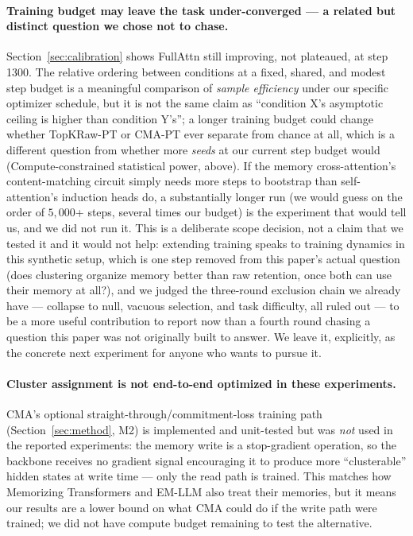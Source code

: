 \documentclass[11pt]{article}
\begin{document}
\paragraph{Training budget may leave the task under-converged --- a related but distinct question
we chose not to chase.} Section~\ref{sec:calibration} shows FullAttn still improving, not
plateaued, at step 1300. The relative ordering between conditions at a fixed, shared, and modest
step budget is a meaningful comparison of \emph{sample efficiency} under our specific optimizer
schedule, but it is not the same claim as ``condition X's asymptotic ceiling is higher than
condition Y's''; a longer training budget could change whether TopKRaw-PT or CMA-PT ever separate
from chance at all, which is a different question from whether more \emph{seeds} at our current
step budget would (Compute-constrained statistical power, above). If the memory cross-attention's
content-matching circuit simply needs more steps to bootstrap than self-attention's induction heads
do, a substantially longer run (we would guess on the order of $5{,}000$+ steps, several times our
budget) is the experiment that would tell us, and we did not run it. This is a deliberate scope
decision, not a claim that we tested it and it would not help: extending training speaks to
training dynamics in this synthetic setup, which is one step removed from this paper's actual
question (does clustering organize memory better than raw retention, once both can use their
memory at all?), and we judged the three-round exclusion chain we already have --- collapse to
null, vacuous selection, and task difficulty, all ruled out --- to be a more useful contribution
to report now than a fourth round chasing a question this paper was not originally built to answer.
We leave it, explicitly, as the concrete next experiment for anyone who wants to pursue it.

\paragraph{Cluster assignment is not end-to-end optimized in these experiments.} CMA's optional
straight-through/commitment-loss training path (Section~\ref{sec:method}, M2) is implemented and
unit-tested but was \emph{not} used in the reported experiments: the memory write is a
stop-gradient operation, so the backbone receives no gradient signal encouraging it to produce
more ``clusterable'' hidden states at write time --- only the read path is trained. This matches
how Memorizing Transformers and EM-LLM also treat their memories, but it means our results are a
lower bound on what CMA could do if the write path were trained; we did not have compute budget
remaining to test the alternative.
\end{document}
